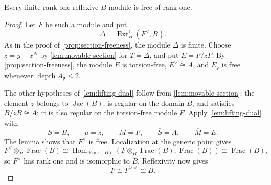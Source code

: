 \documentclass[10pt,a4paper]{amsart}
\newcommand{\Ext}{\operatorname{Ext}}
\newcommand{\Frac}{\operatorname{Frac}}
\newcommand{\Hom}{\operatorname{Hom}}
\newcommand{\Jac}{\operatorname{Jac}}
\newcommand{\depth}{\operatorname{depth}}
\begin{document}
\begin{corollary}
\label{cor:reflexive-B-free}
Every finite rank-one reflexive $B$-module is free of rank one.
\end{corollary}

\begin{proof}
Let $F$ be such a module and put
\[
  \Delta=\Ext^1_B(F^\vee,B).
\]
As in the proof of \cref{prop:section-freeness}, the module $\Delta$ is
finite.  Choose $z=y-x^N$ by \cref{lem:movable-section} for
$T=\Delta$, and put $E=F/zF$.  By
\cref{prop:section-freeness}, the module $E$ is torsion-free,
$E^\vee\cong A$, and $E_{\mathfrak p}$ is free whenever
$\depth A_{\mathfrak p}\leq2$.

The other hypotheses of \cref{lem:lifting-dual} follow from
\cref{lem:movable-section}: the element $z$ belongs to $\Jac(B)$, is
regular on the domain $B$, and satisfies $B/zB\cong A$; it is also regular
on the torsion-free module $F$.  Apply \cref{lem:lifting-dual} with
\[
 S=B,\qquad u=z,\qquad M=F,
 \qquad\overline S=A,\qquad\overline M=E.
\]
The lemma shows that $F^\vee$ is free.  Localization at the generic point gives
\[
 F^\vee\otimes_B\Frac(B)
 \cong\Hom_{\Frac(B)}
       (F\otimes_B\Frac(B),\Frac(B))
 \cong\Frac(B),
\]
so $F^\vee$ has rank one and is isomorphic to $B$.  Reflexivity now gives
\[
  F\cong F^{\vee\vee}\cong B.
\]
\end{proof}
\end{document}
